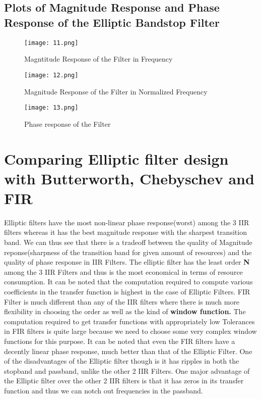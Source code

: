 \documentclass[12pt]{article}
\begin{document}
\subsection{ Plots of Magnitude Response and Phase Response of the Elliptic Bandstop Filter}

\begin{figure}[H]
    \centering
    \texttt{[image: 11.png]}
    \caption{Magntitude Response of the Filter in Frequency}
\end{figure}

\begin{figure}[H]
    \centering
    \texttt{[image: 12.png]}
    \caption{Magnitude Response of the Filter in Normalized Frequency}
\end{figure}

\begin{figure}[H]
    \centering
    \texttt{[image: 13.png]}
    \caption{Phase response of the Filter}
\end{figure}

\section{Comparing Elliptic filter design with Butterworth, Chebyschev and FIR}
Elliptic filters have the most non-linear phase response(worst) among the 3 IIR filters whereas it has the best magnitude response with the sharpest transition band. We can thus see that there is a tradeoff between the quality of Magnitude reponse(sharpness of the transition band for given amount of resources) and the quality of phase response in IIR Filters. The elliptic filter has the least order \textbf{N} among the 3 IIR Filters and thus is the most economical in terms of resource consumption. It can be noted that the computation required to compute various coefficients in the transfer function is highest in the case of Elliptic Filters. FIR Filter is much different than any of the IIR filters where there is much more flexibility in choosing the order as well as the kind of \textbf{window function.} The computation required to get transfer functions with appropriately low Tolerances in FIR filters is quite large because we need to choose some very complex window functions for this purpose. It can be noted that even the FIR filters have a decently linear phase response, much better than that of the Elliptic Filter. One of the disadvantages of the Elliptic filter though is it has ripples in both the stopband and passband, unlike the other 2 IIR Filters. One major advantage of the Elliptic filter over the other 2 IIR filters is that it has zeros in its transfer function and thus we can notch out frequencies in the passband.
\end{document}
